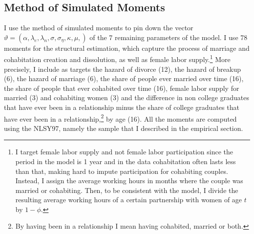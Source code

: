 \documentclass[12pt]{article}
\begin{document}
    \subsection{Method of Simulated Moments}
 I use the method of simulated moments \citep{mcfadden1989,pakes1989} to pin down the vector $\vartheta=(\alpha, \lambda_{e},\lambda_{n}, \sigma, \sigma_{\eta}, \kappa, \mu,)$ of the 7 remaining parameters of the model. I use 78 moments for the structural estimation, which capture the process of marriage and cohabitation creation and dissolution, as well as female labor supply.\footnote{I target female labor supply and not female labor participation since the period in the model is 1 year and in the data cohabitation often lasts less than that, making hard to impute participation for cohabiting couples. Instead, I assign the average working hours in months where the couple was married or cohabiting. Then, to be consistent with the model, I divide the resulting average working hours of a certain partnership with women of age $t$ by $1-\phi$.} More precisely, I include as targets the hazard of divorce (12), the hazard of breakup (6), the hazard of marriage (6), the share of people ever married over time (16), the share of people that ever cohabited over time (16), female labor supply for married (3) and cohabiting women (3) and the difference in non college graduates that have ever been in a relationship minus the share of college graduates that have ever been in a relationship,\footnote{By having been in a relationship I mean having cohabited, married or both.} by age (16). All the moments are computed using the NLSY97, namely the sample that I described in the empirical section. 
 
\end{document}
